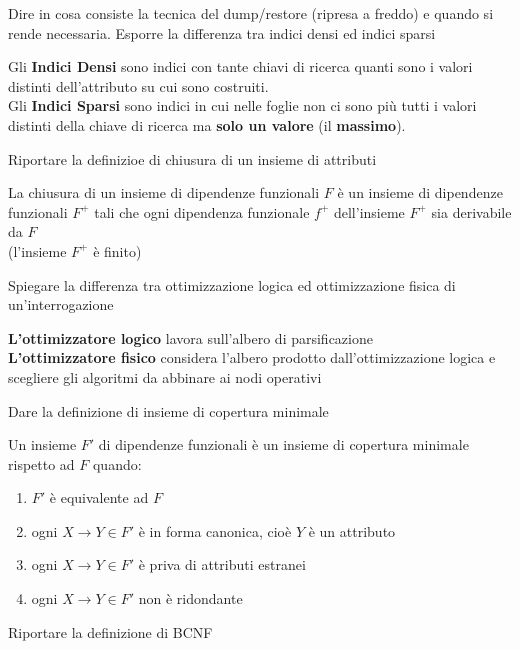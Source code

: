 \documentclass{exam}
\begin{document}
\begin{questions}
    \question Dire in cosa consiste la tecnica del dump/restore (ripresa a freddo) e quando si rende necessaria.
    \question Esporre la differenza tra indici densi ed indici sparsi
    \begin{solution}
        Gli \textbf{Indici Densi} sono indici con tante chiavi di ricerca quanti sono i valori distinti dell'attributo su cui sono costruiti.\\
        Gli \textbf{Indici Sparsi} sono indici in cui nelle foglie non ci sono più tutti i valori distinti della chiave di ricerca ma \textbf{solo un valore} (il \textbf{massimo}).
    \end{solution}
    \question Riportare la definizioe di chiusura di un insieme di attributi
    \begin{solution}
        La chiusura di un insieme di dipendenze funzionali $F$ è un insieme di dipendenze funzionali $F^+$ tali che ogni dipendenza funzionale $f^+$ dell'insieme $F^+$ sia derivabile da $F$ 
        \\(l'insieme $F^+$ è finito)
    \end{solution}
    \question Spiegare la differenza tra ottimizzazione logica ed ottimizzazione fisica di un'interrogazione
    \begin{solution}
        \textbf{L'ottimizzatore logico} lavora sull'albero di parsificazione\\
        \textbf{L'ottimizzatore fisico} considera l'albero prodotto dall'ottimizzazione logica e scegliere gli algoritmi da abbinare ai nodi operativi
    \end{solution}
    \question Dare la definizione di insieme di copertura minimale
    \begin{solution}
        Un insieme $F'$ di dipendenze funzionali è un insieme di  copertura minimale rispetto ad $F$ quando:
        \begin{enumerate}
            \item $F'$ è equivalente ad $F$
            \item ogni $X \rightarrow Y \in F'$ è in forma canonica, cioè $Y$ è un attributo
            \item ogni $X \rightarrow Y \in F'$ è priva di attributi estranei 
            \item ogni $X \rightarrow Y \in F'$ non è ridondante
        \end{enumerate} 
    \end{solution}
    \question Riportare la definizione di BCNF
    \begin{solution}

\end{solution}
\end{questions}
\end{document}
